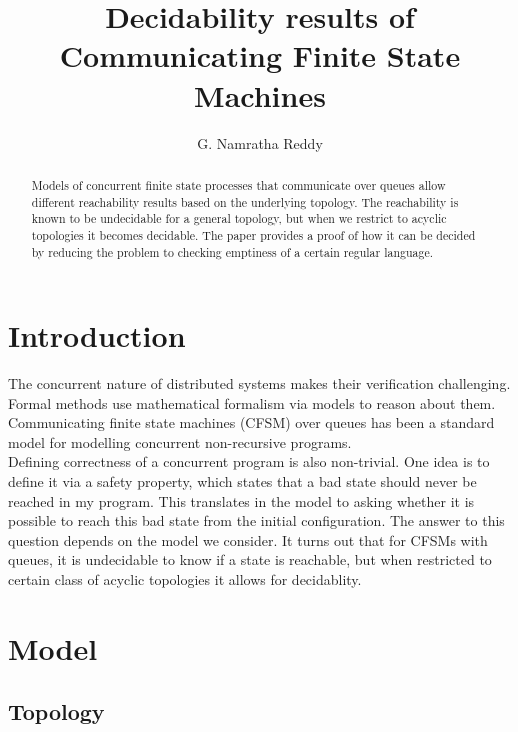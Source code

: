 \documentclass[a4paper,UKenglish,cleveref, autoref, thm-restate]{lipics-v2019}
\title{Decidability results of Communicating Finite
State Machines} %
\author{G. Namratha Reddy}{Chennai Mathematical Institute, India \and  \url{http://www.cmi.ac.in/~namratha} }{}{}{}
\begin{document}
\maketitle

\begin{abstract}
    Models of concurrent finite state processes that communicate over queues allow different reachability results based on the underlying topology. The reachability is known to be undecidable for a general topology, but when we restrict to acyclic topologies it becomes decidable. The paper provides a proof of how it can be decided by reducing the problem to checking emptiness of a certain regular language. 
\end{abstract}

\section{Introduction}
\label{sec:typesetting-summary}

\hspace*{0.5cm}The concurrent nature of distributed systems makes their verification challenging. Formal methods use mathematical formalism via models to reason about them. Communicating finite state machines (CFSM)  over queues has been a standard model for modelling concurrent non-recursive programs. \\
\hspace*{0.5cm}Defining correctness of a concurrent program is also non-trivial. One idea is to define it via a safety property, which states that a bad state should never be reached in my program. This translates in the model to asking whether it is possible to reach this bad state from the initial configuration. The answer to this question depends on the model we consider. It turns out that for CFSMs with queues, it is undecidable to know if a state is reachable, but when restricted to certain class of acyclic topologies it allows for decidablity.


\section{Model}

\subsection{Topology}
\end{document}
